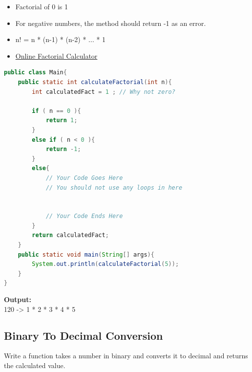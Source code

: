 \documentclass[12pt , a4paper]{article}
\begin{document}
	\begin{importantBox}

		\begin{itemize}
			\item   Factorial of 0 is 1\\
			\item For negative numbers, the method should return -1 as an error.\\
			\item  n! = n * (n-1) * (n-2) * ... * 1\\
			\item \href{https://www.calculatorsoup.com/calculators/discretemathematics/factorials.php}{Online Factorial Calculator}\\
		\end{itemize}
	\end{importantBox}

	\begin{lstlisting}[language=Java]
public class Main{
	public static int calculateFactorial(int n){
		int calculatedFact = 1 ; // Why not zero?

		if ( n == 0 ){
			return 1;
		}
		else if ( n < 0 ){
			return -1;
		}
		else{
			// Your Code Goes Here
			// You should not use any loops in here


			// Your Code Ends Here	
		}
		return calculatedFact;
	}
	public static void main(String[] args){	
		System.out.println(calculateFactorial(5));		
	}
}
	\end{lstlisting}
	\begin{tcolorbox}
	\textbf{Output:}\\
	120 -> 1 * 2 * 3 * 4 * 5\\
	
	\end{tcolorbox}

	\newpage
	\subsection{Binary To Decimal Conversion}
	Write a function takes a number in binary and converts it to decimal and returns the calculated value.
\end{document}
